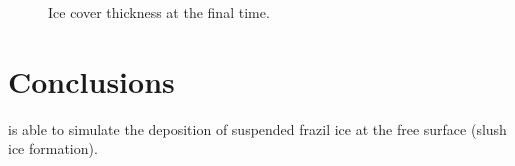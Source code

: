 \begin{figure}[H]
    \begin{center}
    \end{center}
    \caption{Ice cover thickness at the final time.}
    \label{fig:prec_thick}
\end{figure}

\section{Conclusions}

\khione{} is able to simulate the deposition of suspended frazil ice at the free surface (slush ice formation). 

\renewcommand{\labelitemi}{\textbullet}
